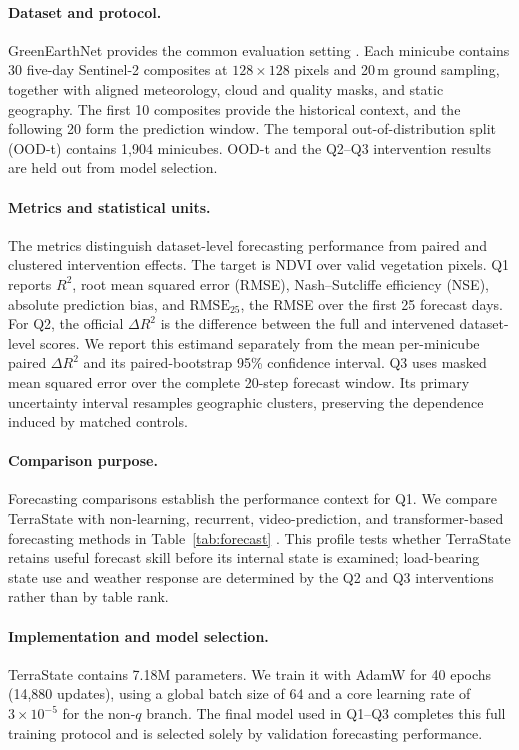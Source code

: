 \documentclass[letterpaper]{article} %
\begin{document}
\paragraph{Dataset and protocol.}
GreenEarthNet provides the common evaluation setting
\cite{benson2024multimodal}. Each minicube
contains 30 five-day Sentinel-2 composites at $128\times128$ pixels and
20\,m ground sampling, together with aligned meteorology, cloud and quality
masks, and static geography. The first 10 composites provide the historical
context, and the following 20 form the prediction window. The temporal
out-of-distribution split (OOD-t) contains 1,904 minicubes. OOD-t and the
Q2--Q3 intervention results are held out from model selection.

\paragraph{Metrics and statistical units.}
The metrics distinguish dataset-level forecasting performance from paired and
clustered intervention effects.
The target is NDVI over valid vegetation pixels. Q1 reports $R^2$, root mean
squared error (RMSE), Nash--Sutcliffe efficiency (NSE), absolute prediction
bias, and $\mathrm{RMSE}_{25}$, the RMSE over the first 25 forecast days.
For Q2, the official $\Delta R^2$ is the difference between the full and
intervened dataset-level scores. We report this estimand separately from the
mean per-minicube paired $\Delta R^2$ and its paired-bootstrap 95\%
confidence interval. Q3 uses masked mean squared error over the complete
20-step forecast window. Its primary uncertainty interval resamples
geographic clusters, preserving the dependence induced by matched controls.

\paragraph{Comparison purpose.}
Forecasting comparisons establish the performance context for Q1. We compare
TerraState with non-learning, recurrent, video-prediction, and
transformer-based forecasting methods in Table~\ref{tab:forecast}
\cite{benson2024multimodal}. This
profile tests whether TerraState retains useful forecast skill before its
internal state is examined; load-bearing state use and weather response are
determined by the Q2 and Q3 interventions rather than by table rank.

\paragraph{Implementation and model selection.}
TerraState contains 7.18M parameters. We train it with AdamW for 40 epochs
(14,880 updates), using a global batch size of 64 and a core learning rate of
$3\times10^{-5}$ for the non-$q$ branch. The final model used in Q1--Q3
completes this full training protocol and is selected solely by validation
forecasting performance.
\end{document}
